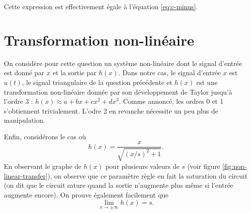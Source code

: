 Cette expression est effectivement égale à
l'équation \ref{eq:c-minus}.

\section{Transformation non-linéaire}

On considère pour cette question un système non-linéaire
dont le signal d'entrée est donné par $x$ et la sortie
par $h(x)$.
Dans notre cas, le signal d'entrée $x$ est $u(t)$,
le signal triangulaire de la question précédente et
$h(x)$ est une transformation non-linéaire donnée par
son développement de Taylor jusqu'à l'ordre 3 :
$h(x) \approx a+bx+cx^2+dx^3$.
Comme annoncé, les ordres 0 et 1 s'obtiennent trivialement.
L'odre 2 en revanche nécessite un peu plus de manipulation.


Enfin, considérons le cas où 
\[ h(x) = \frac{x}{\sqrt{(x/s)^2+1}}.\]
En observant le graphe de $h(x)$ pour plusieurs
valeurs de $s$ (voir figure \ref{fig:non-linear-transfer}),
on observe que ce paramètre règle en fait la saturation du circuit
(on dit que le circuit sature quand la sortie n'augmente plus
même si l'entrée augmente encore). 
On prouve également facilement que
\[ \lim_{x\to\pm\infty} h(x) = s.\]


